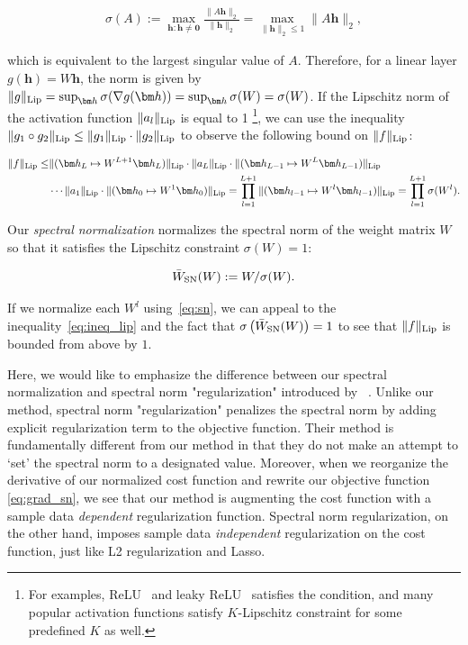 \begin{align}
	\sigma(A) := \max_{{\bm h}: {\bm h} \neq {\bm 0}} \frac{\|A{\bm h}\|_2}{\|{\bm h}\|_2} = \max_{\|{\bm h}\|_2\leq 1} \|A{\bm h}\|_2, \label{eq:spnorm}
\end{align}

which is equivalent to the largest singular value of $A$. Therefore, for a linear layer $g({\bm h}) = W{\bm h}$, the norm is given by $\|g\|_{\rm Lip} = \sup_{\bm h} \sigma(\nabla g({\bm h})) = \sup_{\bm h} \sigma(W) = \sigma(W) $. If the Lipschitz norm of the activation function $\|a_l\|_{\rm Lip}$ is equal to 1 \footnote{For examples, ReLU~\cite[]{jarrett2009best,nair2010rectified, glorot2011deep} and leaky ReLU~\cite[]{maas2013rectifier} satisfies the condition, and many popular activation functions satisfy $K$-Lipschitz constraint for some predefined $K$ as well.}, we can use the inequality $\|g_1\circ g_2\|_{\rm Lip}\leq\|g_1\|_{\rm Lip}\cdot\|g_2\|_{\rm Lip}$ to observe the following bound on $\|f\|_{\rm Lip}$:

\begin{align}
 	\|f\|_{\rm Lip} \leq & \|({\bm h}_{L}\mapsto W^{L+1}{\bm h}_{L})\|_{\rm Lip}\cdot \|a_L\|_{\rm Lip}\cdot\|({\bm h}_{L-1}\mapsto W^ L{\bm h}_{L-1})\|_{\rm Lip} \nonumber \\
    &\cdots \|a_1\|_{\rm Lip}\cdot\|({\bm h}_0\mapsto W^ 1{\bm h}_0)\|_{\rm Lip} = \prod_{l=1}^{L+1} \|({\bm h}_{l-1}\mapsto W^l{\bm h}_{l-1})\|_{\rm Lip} = \prod_{l=1}^{L+1} \sigma(W^l). \label{eq:ineq_lip}
\end{align}

Our \textit{spectral normalization} normalizes the spectral norm of the weight matrix $W$ so that it satisfies the Lipschitz constraint $\sigma(W) = 1$:

\begin{align}
\bar{W}_{\rm SN}(W) := W / \sigma(W) \label{eq:sn}.
\end{align}

If we normalize each $W^l$ using~\eqref{eq:sn}, we can appeal to the inequality~\eqref{eq:ineq_lip} and the fact that $\sigma\left(\bar{W}_{\rm SN}(W)\right) = 1$ to see that $\|f\|_{\rm Lip}$ is bounded from above by $1$.

Here, we would like to emphasize the difference between our spectral normalization and spectral norm "regularization" introduced by ~\cite{yoshida2017spectral}. Unlike our method, spectral norm "regularization" penalizes the spectral norm by adding explicit regularization term to the objective function. Their method is fundamentally different from our method in that they do not make an attempt to `set' the spectral norm to a designated value. Moreover, when we reorganize the derivative of our normalized cost function and rewrite our objective function \eqref{eq:grad_sn}, we see that our method is augmenting the cost function with a sample data \textit{dependent} regularization function. Spectral norm regularization, on the other hand, imposes sample data \textit{independent} regularization on the cost function,  just like L2 regularization and Lasso. 

